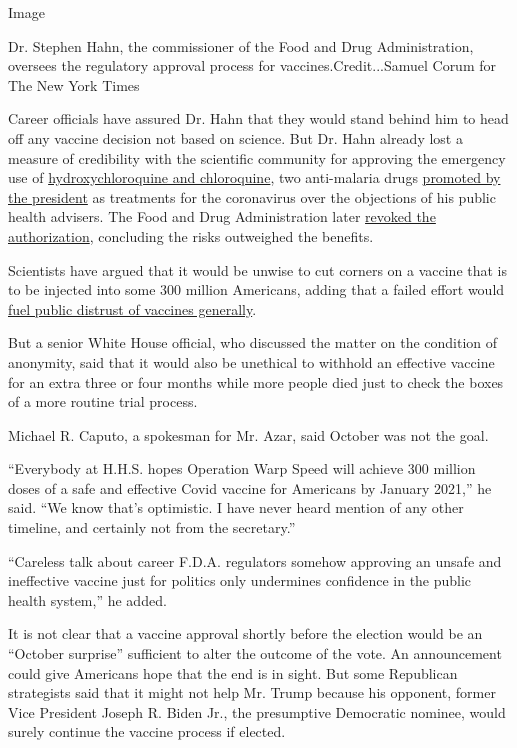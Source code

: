 Image

Dr. Stephen Hahn, the commissioner of the Food and Drug Administration,
oversees the regulatory approval process for vaccines.Credit...Samuel
Corum for The New York Times

Career officials have assured Dr. Hahn that they would stand behind him
to head off any vaccine decision not based on science. But Dr. Hahn
already lost a measure of credibility with the scientific community for
approving the emergency use of
\href{https://www.nytimes.com/2020/06/20/health/hydroxychloroquine-coronavirus-trial.html}{hydroxychloroquine
and chloroquine}, two anti-malaria drugs
\href{https://www.nytimes.com/2020/05/21/us/politics/trump-fact-check-hydroxychloroquine-coronavirus-.html?action=click\&module=RelatedLinks\&pgtype=Article}{promoted
by the president} as treatments for the coronavirus over the objections
of his public health advisers. The Food and Drug Administration later
\href{https://www.nytimes.com/2020/06/15/health/fda-hydroxychloroquine-malaria.html}{revoked
the authorization}, concluding the risks outweighed the benefits.

Scientists have argued that it would be unwise to cut corners on a
vaccine that is to be injected into some 300 million Americans, adding
that a failed effort would
\href{https://www.nytimes.com/2020/07/18/health/coronavirus-anti-vaccine.html}{fuel
public distrust of vaccines generally}.

But a senior White House official, who discussed the matter on the
condition of anonymity, said that it would also be unethical to withhold
an effective vaccine for an extra three or four months while more people
died just to check the boxes of a more routine trial process.

Michael R. Caputo, a spokesman for Mr. Azar, said October was not the
goal.

``Everybody at H.H.S. hopes Operation Warp Speed will achieve 300
million doses of a safe and effective Covid vaccine for Americans by
January 2021,'' he said. ``We know that's optimistic. I have never heard
mention of any other timeline, and certainly not from the secretary.''

``Careless talk about career F.D.A. regulators somehow approving an
unsafe and ineffective vaccine just for politics only undermines
confidence in the public health system,'' he added.

It is not clear that a vaccine approval shortly before the election
would be an ``October surprise'' sufficient to alter the outcome of the
vote. An announcement could give Americans hope that the end is in
sight. But some Republican strategists said that it might not help Mr.
Trump because his opponent, former Vice President Joseph R. Biden Jr.,
the presumptive Democratic nominee, would surely continue the vaccine
process if elected.

